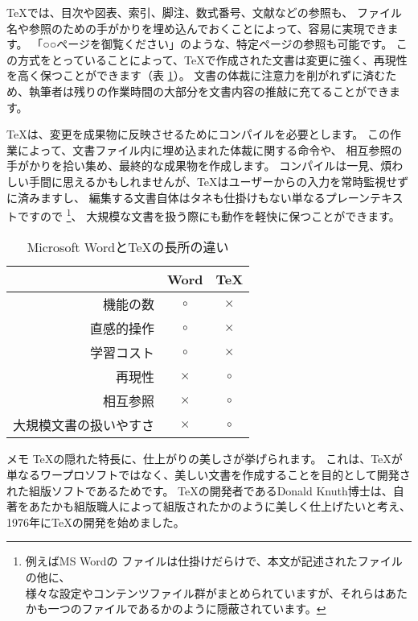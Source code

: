 \documentclass[TeXworkshop]{subfiles}
\begin{document}
\TeX では、目次や図表、索引、脚注、数式番号、文献などの参照も、
ファイル名や参照のための手がかりを埋め込んでおくことによって、容易に実現できます。
「○○ページを御覧ください」のような、特定ページの参照も可能です。
この方式をとっていることによって、\TeX で作成された文書は変更に強く、再現性を高く保つことができます（表 \ref{table:differences}）。
文書の体裁に注意力を削がれずに済むため、執筆者は残りの作業時間の大部分を文書内容の推敲に充てることができます。

\TeX は、変更を成果物に反映させるためにコンパイルを必要とします。
この作業によって、文書ファイル内に埋め込まれた体裁に関する命令や、
相互参照の手がかりを拾い集め、最終的な成果物を作成します。
コンパイルは一見、煩わしい手間に思えるかもしれませんが、\TeX はユーザーからの入力を常時監視せずに済みますし、
編集する文書自体はタネも仕掛けもない単なるプレーンテキストですので
\footnote{例えばMS Wordの ファイルは仕掛けだらけで、本文が記述されたファイルの他に、\\
様々な設定やコンテンツファイル群がまとめられていますが、それらはあたかも一つのファイルであるかのように隠蔽されています。}、
大規模な文書を扱う際にも動作を軽快に保つことができます。

\begin{table}[h]
  \begin{center}
  \caption{Microsoft Wordと\TeX の長所の違い}
  \label{table:differences}
  \begin{tabular}{rcc}
                & Word & \TeX \\\hline
    機能の数              & $\circ$ & $\times$\\
    直感的操作            & $\circ$ & $\times$\\
    学習コスト            & $\circ$ & $\times$\\
    再現性                & $\times$ & $\circ$ \\
    相互参照              & $\times$ & $\circ$ \\
    大規模文書の扱いやすさ& $\times$ & $\circ$ \\\hline
  \end{tabular}
  \end{center}
\end{table}

\begin{itembox}[l]{メモ}
\TeX の隠れた特長に、仕上がりの美しさが挙げられます。
  これは、\TeX が単なるワープロソフトではなく、美しい文書を作成することを目的として開発された組版ソフトであるためです。
  \TeX の開発者であるDonald Knuth博士は、自著をあたかも組版職人によって組版されたかのように美しく仕上げたいと考え、1976年に\TeX の開発を始めました。
\end{itembox}
\end{document}
